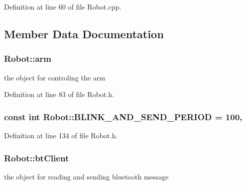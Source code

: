 Definition at line 60 of file Robot.\-cpp.



\subsection{Member Data Documentation}
\hypertarget{classRobot_a444673862cbe384992aceb066282b500}{
\subsubsection[{arm}]{ Robot\-::arm}}\label{classRobot_a444673862cbe384992aceb066282b500}


the object for controling the arm 



Definition at line 83 of file Robot.\-h.

\hypertarget{classRobot_ad0f5c1ce14363f3c05232eceab37ceff}{
\subsubsection[{B\-L\-I\-N\-K\-\_\-\-A\-N\-D\-\_\-\-S\-E\-N\-D\-\_\-\-P\-E\-R\-I\-O\-D}]{\setlength{\rightskip}{0pt plus 5cm}const int Robot\-::\-B\-L\-I\-N\-K\-\_\-\-A\-N\-D\-\_\-\-S\-E\-N\-D\-\_\-\-P\-E\-R\-I\-O\-D = 100\hspace{0.3cm}{\ttfamily [static]}, {\ttfamily [private]}}}\label{classRobot_ad0f5c1ce14363f3c05232eceab37ceff}


Definition at line 134 of file Robot.\-h.

\hypertarget{classRobot_a9da91e6d551ed02038e935b3c755cc75}{
\subsubsection[{bt\-Client}]{ Robot\-::bt\-Client}}\label{classRobot_a9da91e6d551ed02038e935b3c755cc75}


the object for reading and sending bluetooth message 



